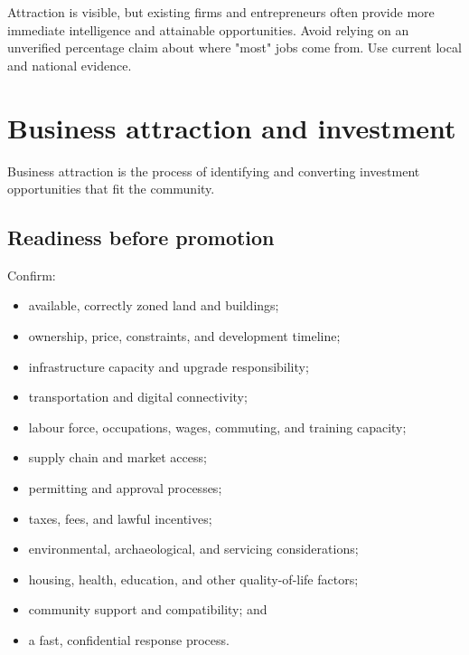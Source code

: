\documentclass[11pt,letterpaper,oneside,openany]{book}
\begin{document}
Attraction is visible, but existing firms and entrepreneurs often provide more immediate intelligence and attainable opportunities. Avoid relying on an unverified percentage claim about where "most" jobs come from. Use current local and national evidence.


\section[Business attraction and investment]{Business attraction and investment}
Business attraction is the process of identifying and converting investment opportunities that fit the community.


\subsection[Readiness before promotion]{Readiness before promotion}
Confirm:


\begin{itemize}
\item available, correctly zoned land and buildings;
\item ownership, price, constraints, and development timeline;
\item infrastructure capacity and upgrade responsibility;
\item transportation and digital connectivity;
\item labour force, occupations, wages, commuting, and training capacity;
\item supply chain and market access;
\item permitting and approval processes;
\item taxes, fees, and lawful incentives;
\item environmental, archaeological, and servicing considerations;
\item housing, health, education, and other quality-of-life factors;
\item community support and compatibility; and
\item a fast, confidential response process.
\end{itemize}


\end{document}
